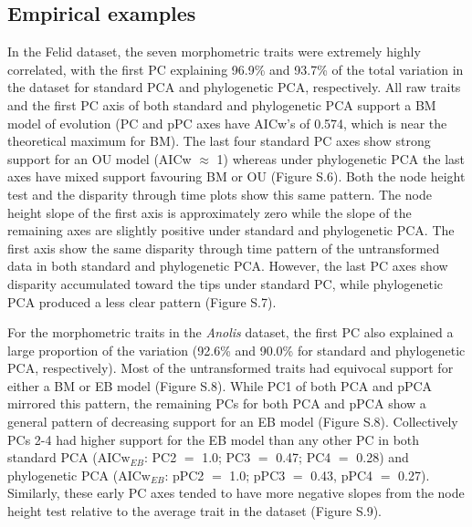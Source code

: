 \documentclass[a4paper,11pt]{article}
\begin{document}
\subsection{Empirical examples}
In the Felid dataset, the seven morphometric traits were extremely highly correlated, with the first PC explaining 96.9\% and 93.7\% of the total variation in the dataset for standard PCA and phylogenetic PCA, respectively. All raw traits and the first PC axis of both standard and phylogenetic PCA support a BM model of evolution (PC and pPC axes have AICw's of 0.574, which is near the theoretical maximum for BM). The last four standard PC axes show strong support for an OU model (AICw $\approx$ 1) whereas under phylogenetic PCA the last axes have mixed support favouring BM or OU (Figure S.6). Both the node height test and the disparity through time plots show this same pattern. The node height slope of the first axis is approximately zero while the slope of the remaining axes are slightly positive under standard and phylogenetic PCA. The first axis show the same disparity through time pattern of the untransformed data in both standard and phylogenetic PCA. However, the last PC axes show disparity accumulated toward the tips under standard PC, while phylogenetic PCA produced a less clear pattern (Figure S.7).

For the morphometric traits in the \textit{Anolis} dataset, the first PC also explained a large proportion of the variation (92.6\% and 90.0\% for standard and phylogenetic PCA, respectively). Most of the untransformed traits had equivocal support for either a BM or EB model (Figure S.8). While PC1 of both PCA and pPCA mirrored this pattern, the remaining PCs for both PCA and pPCA show a general pattern of decreasing support for an EB model (Figure S.8). Collectively PCs 2-4 had higher support for the EB model than any other PC in both standard PCA ($\text{AICw}_{EB}$: PC2 $=$ 1.0; PC3 $=$ 0.47; PC4 $=$ 0.28) and phylogenetic PCA ($\text{AICw}_{EB}$: pPC2 $=$ 1.0; pPC3 $=$ 0.43, pPC4 $=$ 0.27).  Similarly, these early PC axes tended to have more negative slopes from the node height test relative to the average trait in the dataset (Figure S.9).
\end{document}
